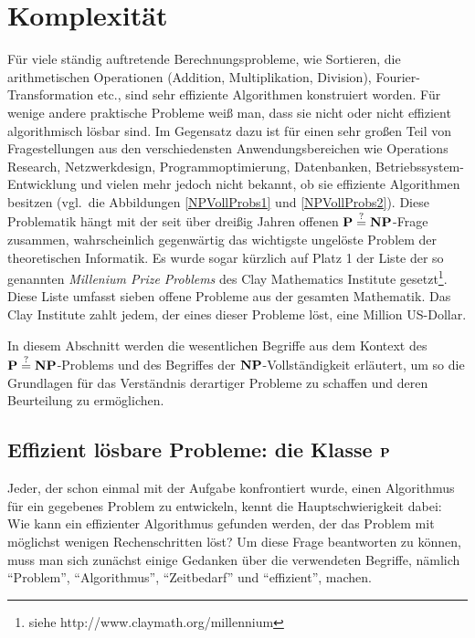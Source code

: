 \section{Komplexität}
\label{KomplexSect}

Für viele ständig auftretende Berechnungsprobleme, wie Sortieren, die
arithmetischen Operationen (Addition, Multiplikation, Division),
Fourier-Transformation etc., sind sehr effiziente Algorithmen
konstruiert worden. Für wenige andere praktische Probleme weiß man,
dass sie nicht oder nicht effizient algorithmisch lösbar sind. Im
Gegensatz dazu ist für einen sehr großen Teil von Fragestellungen aus
den verschiedensten Anwendungsbereichen wie Operations Research,
Netzwerkdesign, Programmoptimierung, Datenbanken,
Betriebssystem-Entwicklung und vielen mehr jedoch nicht bekannt, ob
sie effiziente Algorithmen besitzen (vgl.~die Abbildungen
\ref{NPVollProbs1} und \ref{NPVollProbs2}). Diese Problematik hängt
mit der seit über dreißig Jahren offenen $\P\stackrel{?}{=}\NP$-Frage
zusammen, wahrscheinlich gegenwärtig das wichtigste ungelöste Problem
der theoretischen Informatik. Es wurde sogar kürzlich auf Platz 1 der
Liste der so genannten \emph{Millenium Prize Problems} des Clay
Mathematics Institute gesetzt\footnote{siehe http://www.claymath.org/millennium}.  
Diese Liste umfasst sieben offene Probleme aus der gesamten
Mathematik. Das Clay Institute zahlt jedem, der eines dieser Probleme 
löst, eine Million US-Dollar.

In diesem Abschnitt werden die wesentlichen Begriffe aus dem Kontext
des $\P\stackrel{?}{=}\NP$-Problems und des Begriffes der
$\NP$-Vollständigkeit erläutert, um so die Grundlagen für das
Verständnis derartiger Probleme zu schaffen und deren Beurteilung zu
ermöglichen.

\subsection{Effizient lösbare Probleme: die Klasse $\P$}

Jeder, der schon einmal mit der Aufgabe konfrontiert wurde, einen
Algorithmus für ein gegebenes Problem zu entwickeln, kennt die
Hauptschwierigkeit dabei: Wie kann ein effizienter Algorithmus
gefunden werden, der das Problem mit möglichst wenigen Rechenschritten
löst? Um diese Frage beantworten zu können, muss man sich zunächst
einige Gedanken über die verwendeten Begriffe, nämlich "`Problem"',
"`Algorithmus"', "`Zeitbedarf"' und "`effizient"', machen.

